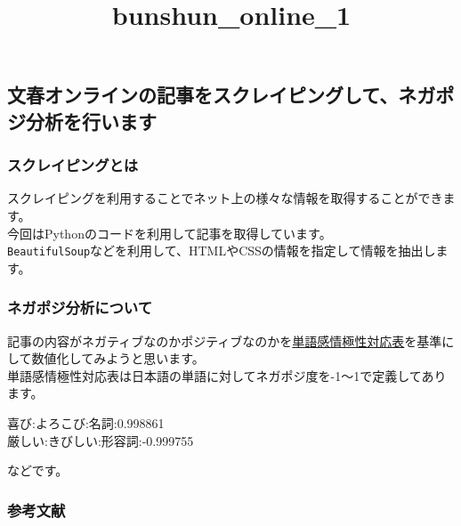\documentclass[11pt]{article}
\title{bunshun\_online\_1}
\begin{document}
    
    \maketitle
    
    

    
    \hypertarget{ux6587ux6625ux30aaux30f3ux30e9ux30a4ux30f3ux306eux8a18ux4e8bux3092ux30b9ux30afux30ecux30a4ux30d4ux30f3ux30b0ux3057ux3066ux30cdux30acux30ddux30b8ux5206ux6790ux3092ux884cux3044ux307eux3059}{%
\subsection{文春オンラインの記事をスクレイピングして、ネガポジ分析を行います}\label{ux6587ux6625ux30aaux30f3ux30e9ux30a4ux30f3ux306eux8a18ux4e8bux3092ux30b9ux30afux30ecux30a4ux30d4ux30f3ux30b0ux3057ux3066ux30cdux30acux30ddux30b8ux5206ux6790ux3092ux884cux3044ux307eux3059}}

\hypertarget{ux30b9ux30afux30ecux30a4ux30d4ux30f3ux30b0ux3068ux306f}{%
\subsubsection{スクレイピングとは}\label{ux30b9ux30afux30ecux30a4ux30d4ux30f3ux30b0ux3068ux306f}}

スクレイピングを利用することでネット上の様々な情報を取得することができます。\\
今回はPythonのコードを利用して記事を取得しています。\\
\texttt{BeautifulSoup}などを利用して、HTMLやCSSの情報を指定して情報を抽出します。

\hypertarget{ux30cdux30acux30ddux30b8ux5206ux6790ux306bux3064ux3044ux3066}{%
\subsubsection{ネガポジ分析について}\label{ux30cdux30acux30ddux30b8ux5206ux6790ux306bux3064ux3044ux3066}}

記事の内容がネガティブなのかポジティブなのかを\href{http://www.lr.pi.titech.ac.jp/~takamura/pndic_ja.html}{単語感情極性対応表}を基準にして数値化してみようと思います。\\
単語感情極性対応表は日本語の単語に対してネガポジ度を-1〜1で定義してあります。

喜び:よろこび:名詞:0.998861\\
厳しい:きびしい:形容詞:-0.999755

などです。

\hypertarget{ux53c2ux8003ux6587ux732e}{%
\subsubsection{参考文献}\label{ux53c2ux8003ux6587ux732e}}
\end{document}
